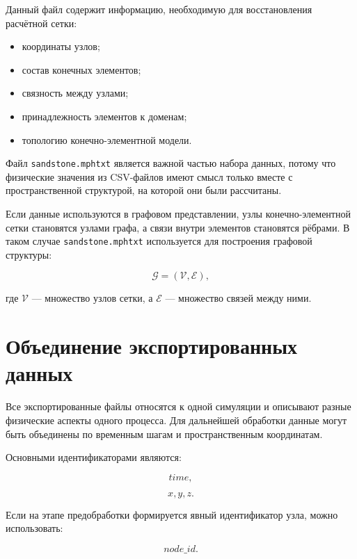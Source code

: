 Данный файл содержит информацию, необходимую для восстановления расчётной сетки:

\begin{itemize}
    \item координаты узлов;
    \item состав конечных элементов;
    \item связность между узлами;
    \item принадлежность элементов к доменам;
    \item топологию конечно-элементной модели.
\end{itemize}

Файл \texttt{sandstone.mphtxt} является важной частью набора данных, потому что физические значения из CSV-файлов имеют смысл только вместе с пространственной структурой, на которой они были рассчитаны.

Если данные используются в графовом представлении, узлы конечно-элементной сетки становятся узлами графа, а связи внутри элементов становятся рёбрами. В таком случае \texttt{sandstone.mphtxt} используется для построения графовой структуры:

\begin{equation}
\mathcal{G}=(\mathcal{V},\mathcal{E}),
\end{equation}

где $\mathcal{V}$ --- множество узлов сетки, а $\mathcal{E}$ --- множество связей между ними.

\section{Объединение экспортированных данных}

Все экспортированные файлы относятся к одной симуляции и описывают разные физические аспекты одного процесса. Для дальнейшей обработки данные могут быть объединены по временным шагам и пространственным координатам.

Основными идентификаторами являются:

\begin{equation}
time,
\end{equation}

\begin{equation}
x,y,z.
\end{equation}

Если на этапе предобработки формируется явный идентификатор узла, можно использовать:

\begin{equation}
node\_id.
\end{equation}

